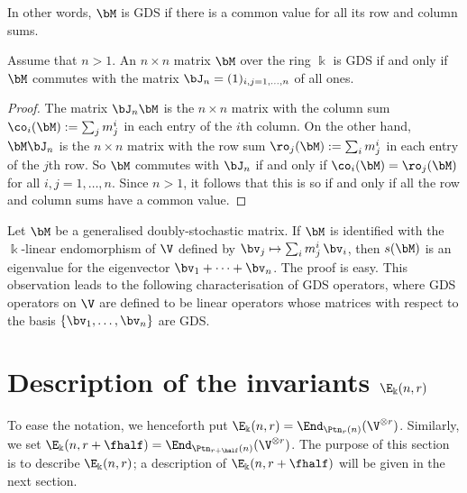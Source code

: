 In other words, $\bM$ is GDS if there is a common value for all its
row and column sums. 

\begin{lemm}\label{lem:GDS}
 Assume that $n > 1$. An $n \times n$ matrix $\bM$ over the ring
 $\Bbbk$ is GDS if and only if $\bM$ commutes with the matrix $\bJ_n =
 (1)_{i,j=1,\dots, n}$ of all ones.
\end{lemm}

\begin{proof}
The matrix $\bJ_n \bM$ is the $n \times n$ matrix with the column sum
$\co_i(\bM) := \sum_j m^i_j$ in each entry of the $i$th column. On the
other hand, $\bM \bJ_n$ is the $n \times n$ matrix with the row sum
$\ro_j(\bM) := \sum_i m^i_j$ in each entry of the $j$th row. So $\bM$
commutes with $\bJ_n$ if and only if $\co_i(\bM) = \ro_j(\bM)$ for all
$i,j = 1, \dots, n$. Since $n > 1$, it follows that this is so if and
only if all the row and column sums have a common value.
\end{proof}

Let $\bM$ be a generalised doubly-stochastic matrix. 
If $\bM$ is identified with the $\Bbbk$-linear endomorphism of $\V$
defined by $\bv_j \mapsto \sum_i m^i_j \, \bv_i$, then $s(\bM)$ is an
eigenvalue for the eigenvector $\bv_1 + \cdots + \bv_n$. The proof is
easy. This observation leads to the following characterisation of GDS
operators, where GDS operators on $\V$ are defined to be linear
operators whose matrices with respect to the basis $\{\bv_1, \dots,
\bv_n\}$ are GDS.

\section{Description of the invariants \texorpdfstring{$\E_\Bbbk(n,r)$}{Ek (n,r)}}%
\label{sec:invariants}%
To ease the notation, we henceforth put $\E_\Bbbk(n,r)
= \End_{\Ptn_r(n)}(\V^{\otimes r})$. Similarly, we set
$\E_\Bbbk(n,r+\fhalf) = \End_{\Ptn_{r+\half}(n)}(\V^{\otimes r})$. The
purpose of this section is to describe $\E_\Bbbk(n,r)$; a description
of $\E_\Bbbk(n,r+\fhalf)$ will be given in the next section.

